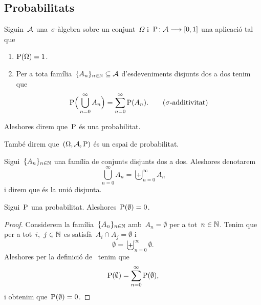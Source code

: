 \documentclass[../../Main.tex]{subfiles}
\begin{document}
\subsection{Probabilitats}
	\begin{definition}[Probabilitat]
		\label{def:probabilitat}
		Siguin~\(\mathcal{A}\) una~\(\sigma\)-àlgebra sobre un conjunt~\(\Omega\) i~\(\mathrm{P}\colon\mathcal{A}\longrightarrow[0,1]\) una aplicació tal que
		\begin{enumerate}
			\item \(\mathrm{P}(\Omega)=1\).
			\item Per a tota família~\(\{A_{n}\}_{n\in\mathbb{N}}\subseteq\mathcal{A}\) d'esdeveniments disjunts dos a dos tenim que
			\begin{equation}
				\mathrm{P}\Big(\bigcup_{n=0}^{\infty}A_{n}\Big)=\sum_{n=0}^{\infty}\mathrm{P}(A_{n}).
				\tag{\(\sigma\)-additivitat}
			\end{equation}
		\end{enumerate}
		Aleshores direm que~\(\mathrm{P}\) és una probabilitat.
		
		També direm que~\((\Omega,\mathcal{A},\mathrm{P})\) és un espai de probabilitat.
	\end{definition}
	\begin{notation}
		Sigui~\(\{A_{n}\}_{n\in\mathbb{N}}\) una família de conjunts disjunts dos a dos.
		Aleshores denotarem
		\[
		    \bigcup_{n=0}^{\infty}A_{n}=\biguplus_{n=0}^{\infty}A_{n}
		\]
		i direm que és la unió disjunta.
	\end{notation}
	\begin{proposition}
		\label{prop:la probabilitat del buit és nulla}
		Sigui~\(\mathrm{P}\) una probabilitat.
		Aleshores~\(\mathrm{P}(\emptyset)=0\).
		\begin{proof}
			Considerem la família~\(\{A_{n}\}_{n\in\mathbb{N}}\) amb~\(A_{n}=\emptyset\) per a tot~\(n\in\mathbb{N}\).
			Tenim que per a tot~\(i\),~\(j\in\mathbb{N}\) es satisfà~\(A_{i}\cap A_{j}=\emptyset\) i
			\[
			    \emptyset=\biguplus_{n=0}^{\infty}\emptyset.
			\]
			Aleshores per la definició de~ tenim que
			\[
			    \mathrm{P}(\emptyset)=\sum_{n=0}^{\infty}\mathrm{P}(\emptyset),
			\]
			i obtenim que~\(\mathrm{P}(\emptyset)=0\).
		\end{proof}
	\end{proposition}
\end{document}
